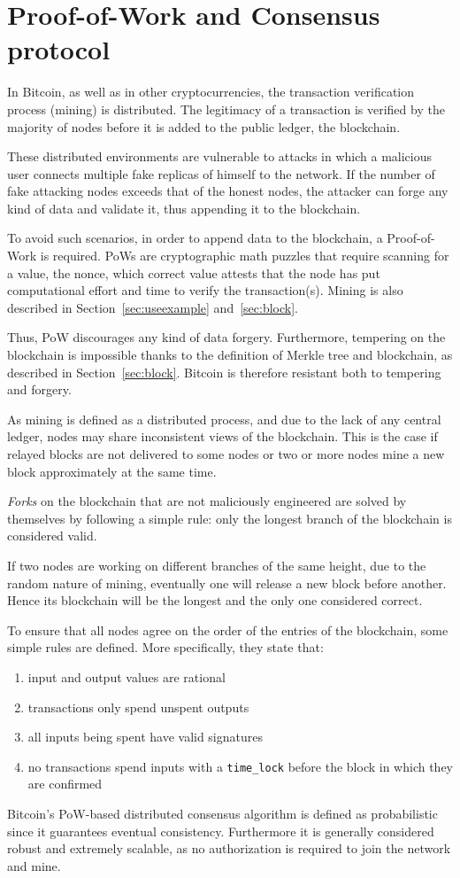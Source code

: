 \section{Proof-of-Work and Consensus protocol}\label{sec:consensus}
In Bitcoin, as well as in other cryptocurrencies, the transaction verification process (mining) is distributed. The legitimacy of a transaction is verified by the majority of nodes before it is added to the public ledger, the blockchain.

These distributed environments are vulnerable to attacks in which a malicious user connects multiple fake replicas of himself to the network. If the number of fake attacking nodes exceeds that of the honest nodes, the attacker can forge any kind of data and validate it, thus appending it to the blockchain.

To avoid such scenarios, in order to append data to the blockchain, a Proof-of-Work is required. PoWs are cryptographic math puzzles that require scanning for a value, the nonce, which correct value attests that the node has put computational effort and time to verify the transaction(s). Mining is also described in Section~\ref{sec:useexample} and~\ref{sec:block}.

Thus, PoW discourages any kind of data forgery. Furthermore, tempering on the blockchain is impossible thanks to the definition of Merkle tree and blockchain, as described in Section~\ref{sec:block}. Bitcoin is therefore resistant both to tempering and forgery.

As mining is defined as a distributed process, and due to the lack of any central ledger, nodes may share inconsistent views of the blockchain. This is the case if relayed blocks are not delivered to some nodes or two or more nodes mine a new block approximately at the same time.

\emph{Forks} on the blockchain that are not maliciously engineered are solved by themselves by following a simple rule: only the longest branch of the blockchain is considered valid.

If two nodes are working on different branches of the same height, due to the random nature of mining, eventually one will release a new block before another. Hence its blockchain will be the longest and the only one considered correct.

To ensure that all nodes agree on the order of the entries of the blockchain, some simple rules are defined. More specifically, they state that:
\begin{enumerate}
	\item input and output values are rational
	\item transactions only spend unspent outputs
	\item all inputs being spent have valid signatures
	\item no transactions spend inputs with a \texttt{time\_lock} before the block in which they are confirmed
\end{enumerate} 
 
Bitcoin's PoW-based distributed consensus algorithm is defined as probabilistic since it guarantees eventual consistency. Furthermore it is generally considered robust and extremely scalable, as no authorization is required to join the network and mine.\\